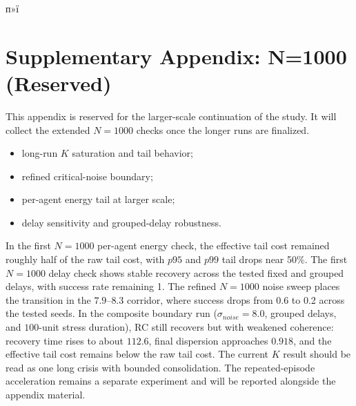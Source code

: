 ﻿п»ї\documentclass[12pt,a4paper]{article}
\begin{document}
\section*{Supplementary Appendix: N=1000 (Reserved)}
This appendix is reserved for the larger-scale continuation of the study. It will collect the extended $N=1000$ checks once the longer runs are finalized.
\begin{itemize}
    \item long-run $K$ saturation and tail behavior;
    \item refined critical-noise boundary;
    \item per-agent energy tail at larger scale;
    \item delay sensitivity and grouped-delay robustness.
\end{itemize}
In the first $N=1000$ per-agent energy check, the effective tail cost remained roughly half of the raw tail cost, with $p95$ and $p99$ tail drops near 50\%.
The first $N=1000$ delay check shows stable recovery across the tested fixed and grouped delays, with success rate remaining 1.
The refined $N=1000$ noise sweep places the transition in the $7.9$--$8.3$ corridor, where success drops from 0.6 to 0.2 across the tested seeds.
In the composite boundary run ($\sigma_{noise}=8.0$, grouped delays, and $100$-unit stress duration), RC still recovers but with weakened coherence: recovery time rises to about $112.6$, final dispersion approaches $0.918$, and the effective tail cost remains below the raw tail cost.
The current $K$ result should be read as one long crisis with bounded consolidation. The repeated-episode acceleration remains a separate experiment and will be reported alongside the appendix material.

\end{document}
